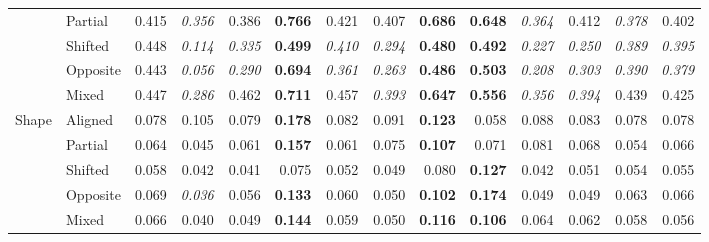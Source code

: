 \begin{tabular}{@{}llrrrrrrrrrrrr@{}}
 & Partial & 0.415 & \textit{0.356} & 0.386 & \textbf{0.766} & 0.421 & 0.407 & \textbf{0.686} & \textbf{0.648} & \textit{0.364} & 0.412 & \textit{0.378} & 0.402\\
 & Shifted & 0.448 & \textit{0.114} & \textit{0.335} & \textbf{0.499} & \textit{0.410} & \textit{0.294} & \textbf{0.480} & \textbf{0.492} & \textit{0.227} & \textit{0.250} & \textit{0.389} & \textit{0.395}\\
 & Opposite & 0.443 & \textit{0.056} & \textit{0.290} & \textbf{0.694} & \textit{0.361} & \textit{0.263} & \textbf{0.486} & \textbf{0.503} & \textit{0.208} & \textit{0.303} & \textit{0.390} & \textit{0.379}\\
 & Mixed & 0.447 & \textit{0.286} & 0.462 & \textbf{0.711} & 0.457 & \textit{0.393} & \textbf{0.647} & \textbf{0.556} & \textit{0.356} & \textit{0.394} & 0.439 & 0.425\\
\addlinespace[2pt]
Shape & Aligned & 0.078 & 0.105 & 0.079 & \textbf{0.178} & 0.082 & 0.091 & \textbf{0.123} & 0.058 & 0.088 & 0.083 & 0.078 & 0.078\\
 & Partial & 0.064 & 0.045 & 0.061 & \textbf{0.157} & 0.061 & 0.075 & \textbf{0.107} & 0.071 & 0.081 & 0.068 & 0.054 & 0.066\\
 & Shifted & 0.058 & 0.042 & 0.041 & 0.075 & 0.052 & 0.049 & 0.080 & \textbf{0.127} & 0.042 & 0.051 & 0.054 & 0.055\\
 & Opposite & 0.069 & \textit{0.036} & 0.056 & \textbf{0.133} & 0.060 & 0.050 & \textbf{0.102} & \textbf{0.174} & 0.049 & 0.049 & 0.063 & 0.066\\
 & Mixed & 0.066 & 0.040 & 0.049 & \textbf{0.144} & 0.059 & 0.050 & \textbf{0.116} & \textbf{0.106} & 0.064 & 0.062 & 0.058 & 0.056\\
\bottomrule
\end{tabular}